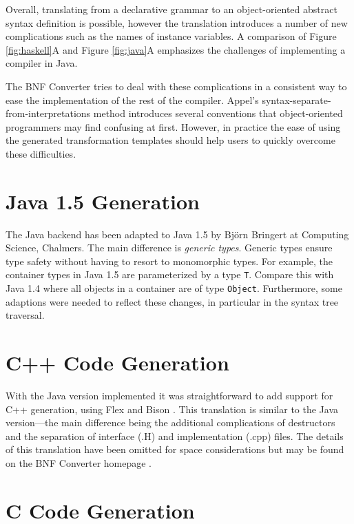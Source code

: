 
Overall, translating from a declarative grammar to an object-oriented 
abstract syntax definition is possible, however the translation introduces a number of new complications such as the names of instance variables. A comparison of Figure \ref{fig:haskell}A and Figure \ref{fig:java}A emphasizes the challenges of implementing a compiler in Java.
 
The BNF Converter tries to deal with these complications in a consistent way to ease the implementation of the rest of the compiler. Appel's syntax-separate-from-interpretations method introduces several conventions that object-oriented programmers may find confusing at first. However, in practice the ease of using the generated transformation templates should help users to quickly overcome these difficulties.

\section{Java 1.5 Generation}
\label{sec:java15}

The Java backend has been adapted to Java 1.5 by Bj{\"o}rn Bringert at
Computing Science, Chalmers. The main difference is \textit{generic types}. 
Generic types ensure type safety without having to resort to monomorphic types. For example,
 the container types in Java 1.5 are parameterized by a type
 \texttt{T}. Compare this with Java 1.4 where all objects in a
 container are of type \texttt{Object}. Furthermore, some 
adaptions were needed to reflect these changes, in particular in 
the syntax tree traversal.

\section{C++ Code Generation}

With the Java version implemented it was straightforward to add support for C++ generation, using Flex \cite{flex} and Bison \cite{bison}. This translation is similar to the Java version---the main difference being the additional complications of destructors and the separation of interface (.H) and implementation (.cpp) files. The details of this translation have been omitted for space considerations but may be found on the BNF Converter homepage \cite{bnfcsite}.

\section{C Code Generation}

